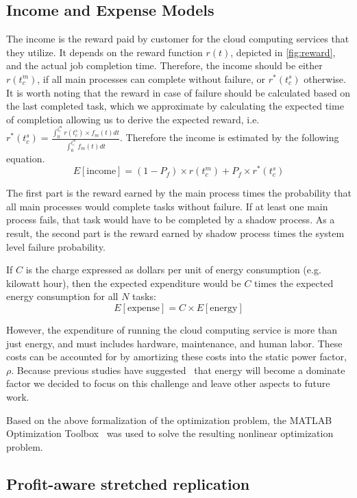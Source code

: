 \subsection{Income and Expense Models}
The income is the reward paid by customer for the cloud computing
services that they utilize. It depends on the reward function $r(t)$,
depicted in \ref{fig:reward}, and the actual job completion
time. Therefore, the income should be either $r(t_c^m)$, if all main
processes can complete without failure, or $r^*(t_c^s)$ otherwise. It
is worth noting that the reward in case of failure should be
calculated based on the last completed task, which we approximate by
calculating the expected time of completion allowing us to derive the
expected reward, i.e. $r^*(t_c^s)=\frac{\int_0^{t_c^m}r(t_c^s) \times
f_m(t)dt}{\int_0^{t_c^m}f_m(t)dt}$. Therefore the income is estimated
by the following equation.
\begin{equation}
E[\text{income}]= (1-P_f) \times r(t_c^m) + P_f \times r^*(t_c^s)
\end{equation}


The first part is the reward earned by the main process times the
probability that all main processes would complete tasks without
failure. If at least one main process fails, that task would have to
be completed by a shadow process. As a result, the second part is the
reward earned by shadow process times the system level failure probability.

If $C$ is the charge expressed as dollars per unit of energy consumption
(e.g. kilowatt hour), then the expected expenditure would be $C$ times
the expected energy consumption for all $N$ tasks:
\begin{equation}
E[\text{expense}] = C \times E[\text{energy}]
\label{eq:expense}
\end{equation}

However, the expenditure of running the cloud computing service is more
than just energy, and must includes hardware, maintenance, and human
labor. These costs can be accounted for by amortizing these costs into the
static power factor, $\rho$. Because previous studies have
suggested~\cite{Elnozahy03energyconservation,Raghavendra:2008:NPS}
that energy will become a dominate factor we decided to focus on this
challenge and leave other aspects to future work.

Based on the above formalization of the optimization problem, the
MATLAB Optimization Toolbox~\cite{matlab_opt} was used to solve the
resulting nonlinear optimization problem.

\subsection{Profit-aware stretched replication} 


